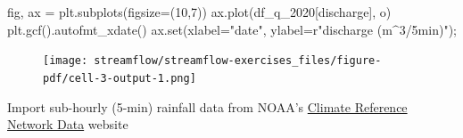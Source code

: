 \documentclass[
  letterpaper,
  DIV=11,
  numbers=noendperiod]{scrreprt}
\newenvironment{Shaded}{\begin{snugshade}}{\end{snugshade}}
\newcommand{\BuiltInTok}[1]{\textcolor[rgb]{0.00,0.23,0.31}{#1}}
\newcommand{\DecValTok}[1]{\textcolor[rgb]{0.68,0.00,0.00}{#1}}
\newcommand{\NormalTok}[1]{\textcolor[rgb]{0.00,0.23,0.31}{#1}}
\newcommand{\OperatorTok}[1]{\textcolor[rgb]{0.37,0.37,0.37}{#1}}
\newcommand{\StringTok}[1]{\textcolor[rgb]{0.13,0.47,0.30}{#1}}
\newcommand{\VerbatimStringTok}[1]{\textcolor[rgb]{0.13,0.47,0.30}{#1}}
\begin{document}
\begin{Shaded}
\begin{Highlighting}[]
\NormalTok{fig, ax }\OperatorTok{=}\NormalTok{ plt.subplots(figsize}\OperatorTok{=}\NormalTok{(}\DecValTok{10}\NormalTok{,}\DecValTok{7}\NormalTok{))}
\NormalTok{ax.plot(df\_q\_2020[}\StringTok{\textquotesingle{}discharge\textquotesingle{}}\NormalTok{], }\StringTok{\textquotesingle{}{-}o\textquotesingle{}}\NormalTok{)}
\NormalTok{plt.gcf().autofmt\_xdate()}
\NormalTok{ax.}\BuiltInTok{set}\NormalTok{(xlabel}\OperatorTok{=}\StringTok{"date"}\NormalTok{,}
\NormalTok{       ylabel}\OperatorTok{=}\VerbatimStringTok{r"discharge (m$\^{}3$/5min)"}\NormalTok{)}\OperatorTok{;}
\end{Highlighting}
\end{Shaded}

\begin{figure}[H]

{\centering \texttt{[image: streamflow/streamflow-exercises\_files/figure-pdf/cell-3-output-1.png]}

}

\end{figure}

Import sub-hourly (5-min) rainfall data from NOAA's
\href{https://www.ncdc.noaa.gov/crn/qcdatasets.html}{Climate Reference
Network Data} website
\end{document}
